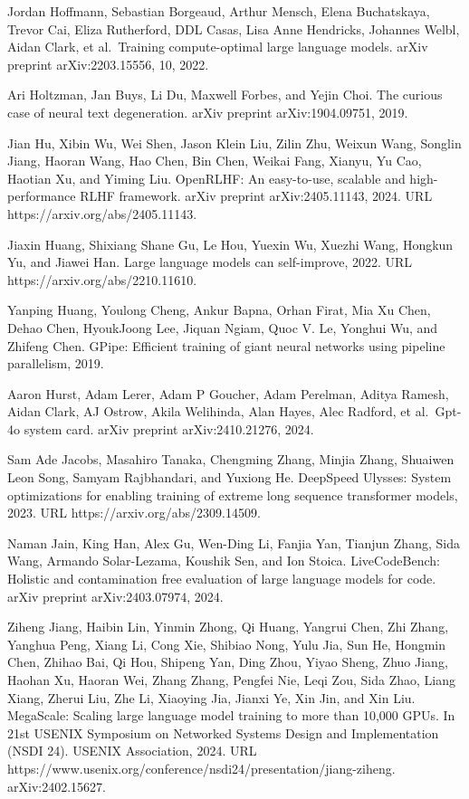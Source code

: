 \documentclass[
  10
]{article}
\begin{document}
Jordan Hoffmann, Sebastian Borgeaud, Arthur Mensch, Elena Buchatskaya,
Trevor Cai, Eliza Rutherford, DDL Casas, Lisa Anne Hendricks, Johannes
Welbl, Aidan Clark, et al.~Training compute-optimal large language
models. arXiv preprint arXiv:2203.15556, 10, 2022.

Ari Holtzman, Jan Buys, Li Du, Maxwell Forbes, and Yejin Choi. The
curious case of neural text degeneration. arXiv preprint
arXiv:1904.09751, 2019.

Jian Hu, Xibin Wu, Wei Shen, Jason Klein Liu, Zilin Zhu, Weixun Wang,
Songlin Jiang, Haoran Wang, Hao Chen, Bin Chen, Weikai Fang, Xianyu, Yu
Cao, Haotian Xu, and Yiming Liu. OpenRLHF: An easy-to-use, scalable and
high-performance RLHF framework. arXiv preprint arXiv:2405.11143, 2024.
URL https://arxiv.org/abs/2405.11143.



Jiaxin Huang, Shixiang Shane Gu, Le Hou, Yuexin Wu, Xuezhi Wang, Hongkun
Yu, and Jiawei Han. Large language models can self-improve, 2022. URL
https://arxiv.org/abs/2210.11610.

Yanping Huang, Youlong Cheng, Ankur Bapna, Orhan Firat, Mia Xu Chen,
Dehao Chen, HyoukJoong Lee, Jiquan Ngiam, Quoc V. Le, Yonghui Wu, and
Zhifeng Chen. GPipe: Efficient training of giant neural networks using
pipeline parallelism, 2019.

Aaron Hurst, Adam Lerer, Adam P Goucher, Adam Perelman, Aditya Ramesh,
Aidan Clark, AJ Ostrow, Akila Welihinda, Alan Hayes, Alec Radford, et
al.~Gpt-4o system card. arXiv preprint arXiv:2410.21276, 2024.

Sam Ade Jacobs, Masahiro Tanaka, Chengming Zhang, Minjia Zhang, Shuaiwen
Leon Song, Samyam Rajbhandari, and Yuxiong He. DeepSpeed Ulysses: System
optimizations for enabling training of extreme long sequence transformer
models, 2023. URL https://arxiv.org/abs/2309.14509.

Naman Jain, King Han, Alex Gu, Wen-Ding Li, Fanjia Yan, Tianjun Zhang,
Sida Wang, Armando Solar-Lezama, Koushik Sen, and Ion Stoica.
LiveCodeBench: Holistic and contamination free evaluation of large
language models for code. arXiv preprint arXiv:2403.07974, 2024.

Ziheng Jiang, Haibin Lin, Yinmin Zhong, Qi Huang, Yangrui Chen, Zhi
Zhang, Yanghua Peng, Xiang Li, Cong Xie, Shibiao Nong, Yulu Jia, Sun He,
Hongmin Chen, Zhihao Bai, Qi Hou, Shipeng Yan, Ding Zhou, Yiyao Sheng,
Zhuo Jiang, Haohan Xu, Haoran Wei, Zhang Zhang, Pengfei Nie, Leqi Zou,
Sida Zhao, Liang Xiang, Zherui Liu, Zhe Li, Xiaoying Jia, Jianxi Ye, Xin
Jin, and Xin Liu. MegaScale: Scaling large language model training to
more than 10,000 GPUs. In 21st USENIX Symposium on Networked Systems
Design and Implementation (NSDI 24). USENIX Association, 2024. URL
https://www.usenix.org/conference/nsdi24/presentation/jiang-ziheng.
arXiv:2402.15627.
\end{document}
